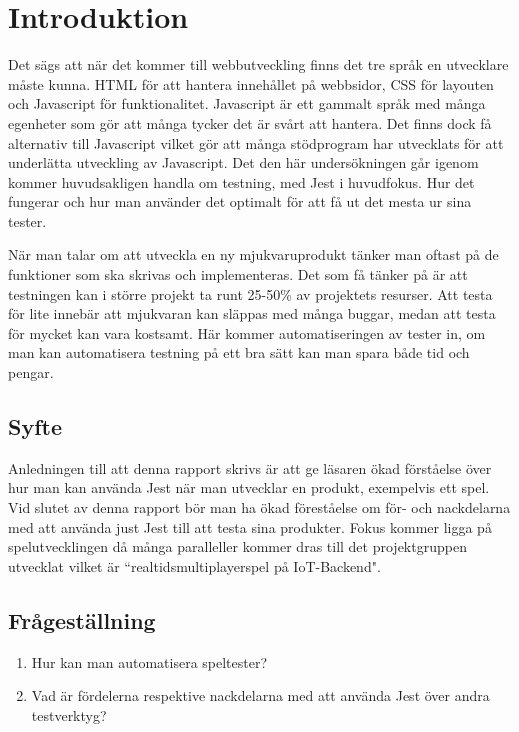 \section{Introduktion}
\label{sec:david-introduction}

Det sägs att när det kommer till webbutveckling finns det tre språk en utvecklare måste kunna. HTML för att hantera innehållet på webbsidor, CSS för layouten och Javascript för funktionalitet. Javascript är ett gammalt språk med många egenheter som gör att många tycker det är svårt att hantera. Det finns dock få alternativ till Javascript vilket gör att många stödprogram har utvecklats för att underlätta utveckling av Javascript. Det den här undersökningen går igenom kommer huvudsakligen handla om testning, med Jest\cite{bib-jest} i huvudfokus. Hur det fungerar och hur man använder det optimalt för att få ut det mesta ur sina tester.

När man talar om att utveckla en ny mjukvaruprodukt tänker man oftast på de funktioner som ska skrivas och implementeras. Det som få tänker på är att testningen kan i större projekt ta runt 25-50\%\cite{ADP} av projektets resurser. Att testa för lite innebär att mjukvaran kan släppas med många buggar, medan att testa för mycket kan vara kostsamt. Här kommer automatiseringen av tester in, om man kan automatisera testning på ett bra sätt kan man spara både tid och pengar.

\subsection{Syfte}
Anledningen till att denna rapport skrivs är att ge läsaren ökad förståelse över hur man kan använda Jest när man utvecklar en produkt, exempelvis ett spel. Vid slutet av denna rapport bör man ha ökad föreståelse om för- och nackdelarna med att använda just Jest till att testa sina produkter. Fokus kommer ligga på spelutvecklingen då många paralleller kommer dras till det projektgruppen utvecklat vilket är ``realtidsmultiplayerspel på IoT-Backend". 




\subsection{Frågeställning}
\label{subsec:david-research-questions}

\begin{enumerate}
\item Hur kan man automatisera speltester?
\item Vad är fördelerna respektive nackdelarna med att använda Jest över andra testverktyg?

\end{enumerate}


